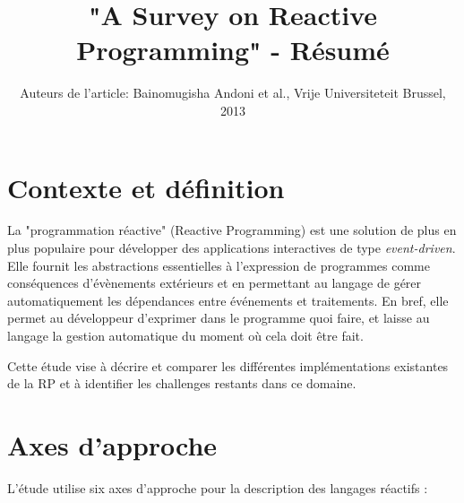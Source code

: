 \documentclass[10pt,final]{IEEEtran}
\begin{document}
\title{"A Survey on Reactive Programming" - Résumé}

\author{Auteurs de l'article: Bainomugisha Andoni et al., Vrije Universiteteit Brussel, 2013}

\maketitle

\section{Contexte et définition}

La "programmation réactive" (Reactive Programming) est une solution de plus en plus populaire pour développer des applications interactives de type \textit{event-driven}. Elle fournit les abstractions essentielles à l'expression de programmes comme conséquences d'évènements extérieurs et en permettant au langage de gérer automatiquement les dépendances entre événements et traitements. En bref, elle permet au développeur d'exprimer dans le programme quoi faire, et laisse au langage la gestion automatique du moment où cela doit être fait.

Cette étude vise à décrire et comparer les différentes implémentations existantes de la RP et à identifier les challenges restants dans ce domaine.

\section{Axes d'approche}
L'étude utilise six axes d'approche pour la description des langages réactifs :
\end{document}
